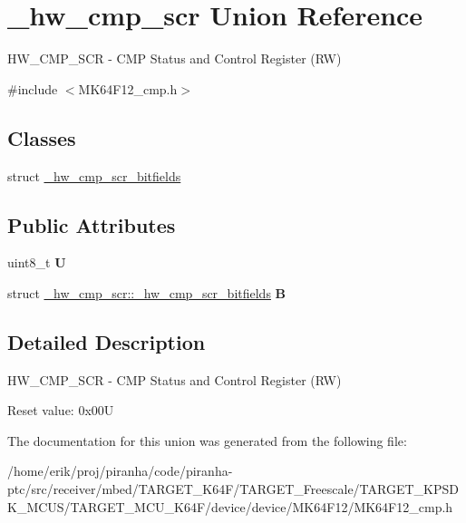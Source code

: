 \hypertarget{union__hw__cmp__scr}{}\section{\+\_\+hw\+\_\+cmp\+\_\+scr Union Reference}
\label{union__hw__cmp__scr}


H\+W\+\_\+\+C\+M\+P\+\_\+\+S\+CR -\/ C\+MP Status and Control Register (RW)  




{\ttfamily \#include $<$M\+K64\+F12\+\_\+cmp.\+h$>$}

\subsection*{Classes}
\begin{DoxyCompactItemize}
\item 
struct \hyperlink{struct__hw__cmp__scr_1_1__hw__cmp__scr__bitfields}{\+\_\+hw\+\_\+cmp\+\_\+scr\+\_\+bitfields}
\end{DoxyCompactItemize}
\subsection*{Public Attributes}
\begin{DoxyCompactItemize}
\item 
uint8\+\_\+t {\bfseries U}\hypertarget{union__hw__cmp__scr_a9a852633406b0d81dcfaff9402c1b8fe}{}\label{union__hw__cmp__scr_a9a852633406b0d81dcfaff9402c1b8fe}

\item 
struct \hyperlink{struct__hw__cmp__scr_1_1__hw__cmp__scr__bitfields}{\+\_\+hw\+\_\+cmp\+\_\+scr\+::\+\_\+hw\+\_\+cmp\+\_\+scr\+\_\+bitfields} {\bfseries B}\hypertarget{union__hw__cmp__scr_a632e751f1005b6e34e68337b8d74744b}{}\label{union__hw__cmp__scr_a632e751f1005b6e34e68337b8d74744b}

\end{DoxyCompactItemize}


\subsection{Detailed Description}
H\+W\+\_\+\+C\+M\+P\+\_\+\+S\+CR -\/ C\+MP Status and Control Register (RW) 

Reset value\+: 0x00U 

The documentation for this union was generated from the following file\+:\begin{DoxyCompactItemize}
\item 
/home/erik/proj/piranha/code/piranha-\/ptc/src/receiver/mbed/\+T\+A\+R\+G\+E\+T\+\_\+\+K64\+F/\+T\+A\+R\+G\+E\+T\+\_\+\+Freescale/\+T\+A\+R\+G\+E\+T\+\_\+\+K\+P\+S\+D\+K\+\_\+\+M\+C\+U\+S/\+T\+A\+R\+G\+E\+T\+\_\+\+M\+C\+U\+\_\+\+K64\+F/device/device/\+M\+K64\+F12/M\+K64\+F12\+\_\+cmp.\+h\end{DoxyCompactItemize}
